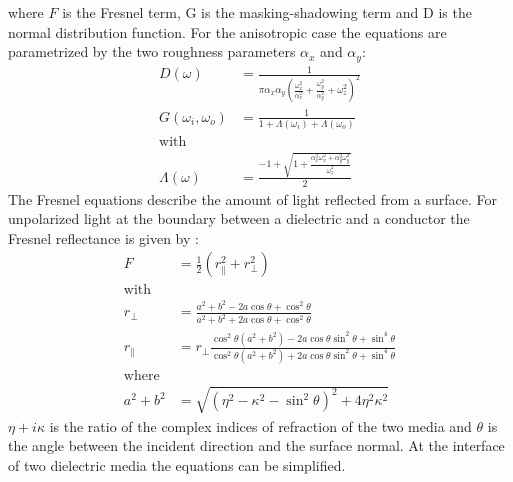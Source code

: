 where $F$ is the Fresnel term, G is the masking-shadowing term and D is the normal distribution function. For the anisotropic case the equations are parametrized by the two roughness parameters $\alpha_x$ and $\alpha_y$:
\begin{equation} \label{eq:g_d_definition}
    \begin{aligned}
        D(\omega) &= \frac{1}{\pi \alpha_x \alpha_y \left( \frac{\omega_x^2}{\alpha_x^2} + \frac{\omega_y^2}{\alpha_y^2} + \omega_z^2 \right)^2} \\
        G(\omega_i, \omega_o) &= \frac{1}{1 + \Lambda(\omega_i) + \Lambda(\omega_o)} \\
        \text{with }\\
        \Lambda(\omega) &= \frac{-1 + \sqrt{1 + \frac{\alpha_x^2 \omega_x^2 + \alpha_y^2 \omega_y^2}{\omega_z^2}}}{2}
    \end{aligned}
\end{equation}
The Fresnel equations describe the amount of light reflected from a surface. For unpolarized light at the boundary between a dielectric and a conductor the Fresnel reflectance is given by \parencite{pharr2023}:
\begin{equation}\label{eq:fresnel_conductor}
    \begin{aligned}
        F &= \frac{1}{2} \left(r_\parallel^2 + r_\perp^2\right) \\
        \text{with}\\ 
        r_\perp &= \frac{a^2 + b^2 - 2a \cos{\theta} + \cos^2{\theta}}{a^2 + b^2 + 2a \cos{\theta} + \cos^2{\theta}}\\
        r_\parallel &= r_\perp \frac{\cos^2{\theta} (a^2+b^2) - 2a \cos{\theta} \sin^2{\theta} + \sin^4{\theta}}{\cos^2{\theta} (a^2+b^2) + 2a \cos{\theta} \sin^2{\theta} + \sin^4{\theta}}\\
        \text{where}\\
        a^2 + b^2 &= \sqrt{(\eta^2 - \kappa^2 - \sin^2{\theta})^2 + 4\eta^2\kappa^2}
    \end{aligned}
\end{equation}
$\eta + i \kappa$ is the ratio of the complex indices of refraction of the two media and $\theta$ is the angle between the incident direction and the surface normal. At the interface of two dielectric media the equations can be simplified.

%

